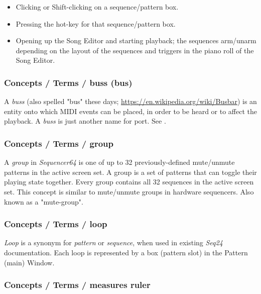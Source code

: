   \begin{itemize}
      \item Clicking or Shift-clicking on a sequence/pattern box.
      \item Pressing the hot-key for that sequence/pattern box.
      \item Opening up the Song Editor and starting playback; the
            sequences arm/unarm depending on the layout of the
            sequences and triggers in the piano roll of the Song Editor.
   \end{itemize}

\subsubsection{Concepts / Terms / buss (bus)}
\label{subsubsec:concepts_terms_buss}

   A \textsl{buss} (also spelled "bus" these days;
   \url{https://en.wikipedia.org/wiki/Busbar}) is an entity onto which
   MIDI events can be placed, in order to be heard or to affect the
   playback.
   A \textsl{buss} is just another name for port.
   See .

\subsubsection{Concepts / Terms / group}
\label{subsubsec:concepts_terms_group}

   A \textsl{group} in \textsl{Sequencer64} is one of up to 32
   previously-defined mute/unmute patterns in the active screen set.
   A group is a set of patterns that can toggle their playing state
   together.  Every group contains all 32 sequences in the active screen
   set.  This concept is similar to mute/unmute groups in hardware
   sequencers.
   Also known as a "mute-group".

\subsubsection{Concepts / Terms / loop}
\label{subsubsec:concepts_terms_loop}

   \textsl{Loop}
   is a synonym for \textsl{pattern} or \textsl{sequence}, when used
   in existing \textsl{Seq24} documentation.
   Each loop is represented by a box (pattern slot) in the Pattern (main)
   Window.

\subsubsection{Concepts / Terms / measures ruler}
\label{subsubsec:concepts_terms_measures_ruler}


